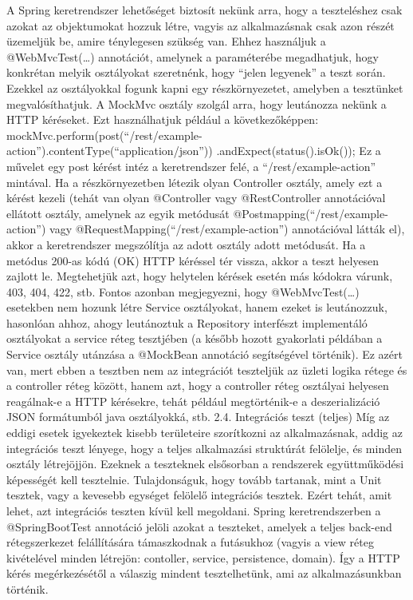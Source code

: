 \documentclass[a4paper, 12 pt]{article}
\begin{document}
A Spring keretrendszer lehetőséget biztosít nekünk arra, hogy a teszteléshez csak azokat az objektumokat hozzuk létre, vagyis az alkalmazásnak csak azon részét üzemeljük be, amire ténylegesen szükség van. Ehhez használjuk a @WebMvcTest(…) annotációt, amelynek a paraméterébe megadhatjuk, hogy konkrétan melyik osztályokat szeretnénk, hogy “jelen legyenek” a teszt során. Ezekkel az osztályokkal fogunk kapni egy részkörnyezetet, amelyben a tesztünket megvalósíthatjuk.
A MockMvc osztály szolgál arra, hogy leutánozza nekünk a HTTP kéréseket. Ezt használhatjuk például a következőképpen:
mockMvc.perform(post(“/rest/example-action”).contentType(“application/json”))
		.andExpect(status().isOk());
Ez a művelet egy post kérést intéz a keretrendszer felé, a “/rest/example-action” mintával. Ha a részkörnyezetben létezik olyan Controller osztály, amely ezt a kérést kezeli (tehát van olyan @Controller vagy @RestController annotációval ellátott osztály, amelynek az egyik metódusát @Postmapping(“/rest/example-action”) vagy @RequestMapping(“/rest/example-action”) annotációval látták el), akkor a keretrendszer megszólítja az adott osztály adott metódusát. Ha a metódus 200-as kódú (OK) HTTP kéréssel tér vissza, akkor a teszt helyesen zajlott le.
Megtehetjük azt, hogy helytelen kérések esetén más kódokra várunk, 403, 404, 422, stb. Fontos azonban megjegyezni, hogy @WebMvcTest(…) esetekben nem hozunk létre Service osztályokat, hanem ezeket is leutánozzuk, hasonlóan ahhoz, ahogy leutánoztuk a Repository interfészt implementáló osztályokat a service réteg tesztjében (a később hozott gyakorlati példában a Service osztály utánzása a @MockBean annotáció segítségével történik). Ez azért van, mert ebben a tesztben nem az integrációt teszteljük az üzleti logika rétege és a controller réteg között, hanem azt, hogy a controller réteg osztályai helyesen reagálnak-e a HTTP kérésekre, tehát például megtörténik-e a deszerializáció JSON formátumból java osztályokká, stb.
2.4. Integrációs teszt (teljes)
Míg az eddigi esetek igyekeztek kisebb területeire szorítkozni az alkalmazásnak, addig az integrációs teszt lényege, hogy a teljes alkalmazási struktúrát felölelje, és minden osztály létrejöjjön. Ezeknek a teszteknek elsősorban a rendszerek együttműködési képességét kell tesztelnie. Tulajdonságuk, hogy tovább tartanak, mint a Unit tesztek, vagy a kevesebb egységet felölelő integrációs tesztek. Ezért tehát, amit lehet, azt integrációs teszten kívül kell megoldani.
Spring keretrendszerben a @SpringBootTest annotáció jelöli azokat a teszteket, amelyek a teljes back-end rétegszerkezet felállítására támaszkodnak a futásukhoz (vagyis a view réteg kivételével minden létrejön: contoller, service, persistence, domain). Így a HTTP kérés megérkezésétől a válaszig mindent tesztelhetünk, ami az alkalmazásunkban történik.
\end{document}
